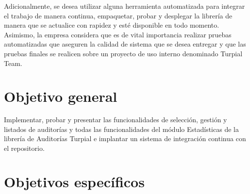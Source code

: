 Adicionalmente, se desea utilizar alguna herramienta automatizada para integrar el trabajo de manera continua, empaquetar, probar y desplegar la librería de manera que se actualice con rapidez y esté disponible en todo momento. Asimismo, la empresa considera que es de vital importancia realizar pruebas automatizadas que aseguren la calidad de sistema que se desea entregar y que las pruebas finales se realicen sobre un proyecto de uso interno denominado Turpial Team.

\section{Objetivo general}

Implementar, probar y presentar las funcionalidades de selección, gestión y listados de auditorías y todas las funcionalidades del módulo Estadísticas de la librería de Auditorías Turpial e implantar un sistema de integración continua con el repositorio.  

\section{Objetivos específicos}
